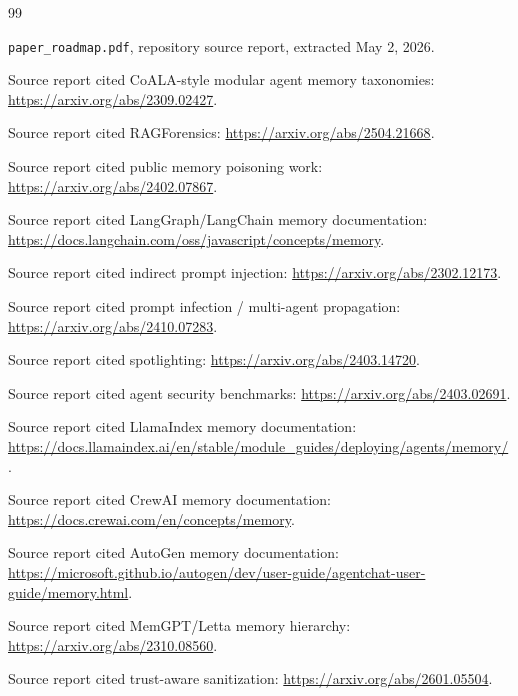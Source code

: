 \documentclass[11pt,oneside]{report}
\begin{document}
\begin{thebibliography}{99}

\texttt{paper\_roadmap.pdf}, repository source report, extracted May 2, 2026.

Source report cited CoALA-style modular agent memory taxonomies:
\url{https://arxiv.org/abs/2309.02427}.

Source report cited RAGForensics:
\url{https://arxiv.org/abs/2504.21668}.

Source report cited public memory poisoning work:
\url{https://arxiv.org/abs/2402.07867}.

Source report cited LangGraph/LangChain memory documentation:
\url{https://docs.langchain.com/oss/javascript/concepts/memory}.

Source report cited indirect prompt injection:
\url{https://arxiv.org/abs/2302.12173}.

Source report cited prompt infection / multi-agent propagation:
\url{https://arxiv.org/abs/2410.07283}.

Source report cited spotlighting:
\url{https://arxiv.org/abs/2403.14720}.

Source report cited agent security benchmarks:
\url{https://arxiv.org/abs/2403.02691}.

Source report cited LlamaIndex memory documentation:
\url{https://docs.llamaindex.ai/en/stable/module_guides/deploying/agents/memory/}.

Source report cited CrewAI memory documentation:
\url{https://docs.crewai.com/en/concepts/memory}.

Source report cited AutoGen memory documentation:
\url{https://microsoft.github.io/autogen/dev/user-guide/agentchat-user-guide/memory.html}.

Source report cited MemGPT/Letta memory hierarchy:
\url{https://arxiv.org/abs/2310.08560}.

Source report cited trust-aware sanitization:
\url{https://arxiv.org/abs/2601.05504}.

\end{thebibliography}
\end{document}
